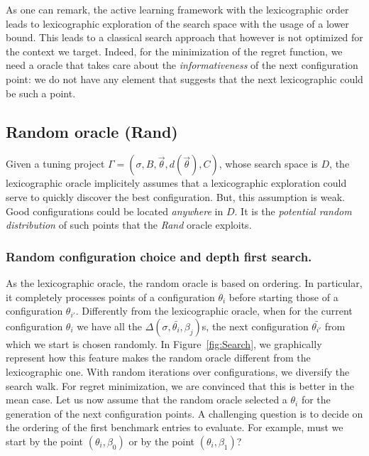 \documentclass[10pt, conference, compsocconf]{IEEEtran}
\begin{document}
        As one can remark, the active learning framework with the
        lexicographic order leads to lexicographic exploration of the
        search space with the usage of a lower bound. This leads to a
        classical search approach that however is not optimized for
        the context we target. Indeed, for the minimization of the
        regret function, we need a oracle that takes care about the
        {\it informativeness} of the next configuration point: we do
        not have any element that suggests that the next lexicographic
        could be such a point.

\subsection{Random  oracle (Rand)}

Given a tuning project
$\Gamma = (\sigma, B, \vec{\theta}, d(\vec{\theta}), C)$, whose search
space is $D$, the lexicographic oracle implicitely assumes that a
lexicographic exploration could serve to quickly discover the best
configuration. But, this assumption is weak. Good configurations could
be located {\it anywhere} in $D$. It is the {\it potential random
  distribution} of such points that the {\it Rand} oracle exploits.

\subsubsection{ Random configuration choice and depth first search.}

As the lexicographic oracle, the random oracle is based on
ordering. In particular, it completely processes points of a
configuration $\theta_{i}$ before starting those of a configuration
$\theta_{i'}$.  Differently from the lexicographic oracle, when for
the current configuration $\theta_i$ we have all the
$\Delta(\sigma, \bar{\theta_i}, \beta_j)$s, the next configuration
$\bar{\theta_{i'}}$ from which we start is chosen randomly. In
Figure~\ref{fig:Search}, we graphically represent how this feature
makes the random oracle different from the lexicographic one. With
random iterations over configurations, we diversify the search
walk. For regret minimization, we are convinced that this is better in
the mean case.  Let us now assume that the random oracle selected a
$\theta_i$ for the generation of the next configuration points. A
challenging question is to decide on the ordering of the first
benchmark entries to evaluate.  For example, must we start by the
point $(\theta_i, \beta_0)$ or by the point $(\theta_i, \beta_1)$?
\end{document}
